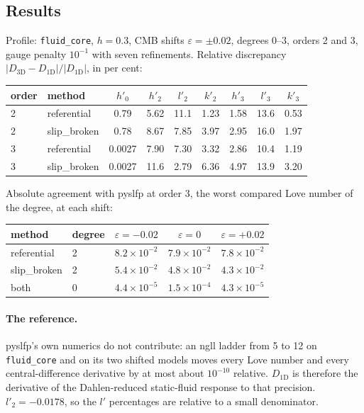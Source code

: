 \documentclass[11pt]{article}
\numberwithin{equation}{section}
\newcommand{\eps}{\varepsilon}
\newcommand{\code}[1]{\texttt{#1}}
\begin{document}
\subsection{Results}

Profile: \code{fluid\_core}, $h=0.3$, CMB shifts $\eps=\pm0.02$, degrees
$0$--$3$, orders 2 and 3, gauge penalty $10^{-1}$ with seven refinements.
Relative discrepancy $|D_{3\text{D}}-D_{1\text{D}}|/|D_{1\text{D}}|$, in
per cent:
\begin{center}
\small
\begin{tabular}{@{}llccccccc@{}}
\toprule
order & method & $h'_0$ & $h'_2$ & $l'_2$ & $k'_2$ & $h'_3$ & $l'_3$ & $k'_3$ \\
\midrule
2 & referential & 0.79 & 5.62 & 11.1 & 1.23 & 1.58 & 13.6 & 0.53 \\
2 & slip\_broken & 0.78 & 8.67 & 7.85 & 3.97 & 2.95 & 16.0 & 1.97 \\
3 & referential & 0.0027 & 7.90 & 7.30 & 3.32 & 2.86 & 10.4 & 1.19 \\
3 & slip\_broken & 0.0027 & 11.6 & 2.79 & 6.36 & 4.97 & 13.9 & 3.20 \\
\bottomrule
\end{tabular}
\end{center}
Absolute agreement with pyslfp at order 3, the worst compared Love number
of the degree, at each shift:
\begin{center}
\small
\begin{tabular}{@{}llccc@{}}
\toprule
method & degree & $\eps=-0.02$ & $\eps=0$ & $\eps=+0.02$ \\
\midrule
referential & 2 & $8.2\times10^{-2}$ & $7.9\times10^{-2}$ & $7.8\times10^{-2}$ \\
slip\_broken & 2 & $5.4\times10^{-2}$ & $4.8\times10^{-2}$ & $4.3\times10^{-2}$ \\
both & 0 & $4.4\times10^{-5}$ & $1.5\times10^{-4}$ & $4.3\times10^{-5}$ \\
\bottomrule
\end{tabular}
\end{center}

\paragraph{The reference.}
pyslfp's own numerics do not contribute: an ngll ladder from 5 to 12 on
\code{fluid\_core} and on its two shifted models moves every Love number
and every central-difference derivative by at most about $10^{-10}$
relative. $D_{1\text{D}}$ is therefore the derivative of the
Dahlen-reduced static-fluid response to that precision. $l'_2=-0.0178$, so
the $l'$ percentages are relative to a small denominator.
\end{document}
